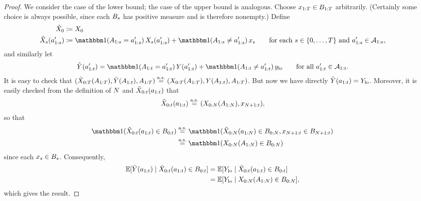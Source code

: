 \begin{proof}
    We consider the case of the lower bound; the case of the upper bound is analogous.
    Choose $x_{1:T} \in B_{1:T}$ arbitrarily.
    (Certainly some choice is always possible, since each $B_{s}$ has positive measure and is therefore nonempty.)
    Define
    \begin{align*}
        \tilde{\X}_0 &\coloneqq \X_0 \\
        \tilde{\X}_{\sx}(\ax_{1:\sx}') &\coloneqq \ind(\A_{1:\sx} = \ax_{1:\sx}') \, \X_{\sx}(\ax_{1:\sx}') + \ind(\A_{1:\sx} \neq \ax_{1:\sx}') \, \xx_{\sx} \qquad \text{for each $\sx \in \{0, \ldots, \T\}$ and $\ax_{1:\sx}' \in \Aspace_{1:\sx}$},
    \end{align*}
    and similarly let
    \[
        \tilde{\Y}(\ax_{1:\tx}') = \ind(\A_{1:\tx} = \ax_{1:\tx}') \, \Y(\ax_{1:\tx}') + \ind(\A_{1:\tx} \neq \ax_{1:\tx}')\, \ylo \qquad \text{for all $\ax_{1:\tx}' \in \Aspace_{1:\tx}$}.
    \]
    It is easy to check that $(\tilde{X}_{0:T}(A_{1:T}), \tilde{Y}(A_{1:t}), A_{1:T}) \overset{\mathrm{a.s.}}{=} (X_{0:T}(A_{1:T}), Y(A_{1:t}), A_{1:T})$.
    But now we have directly $\tilde{Y}(a_{1:t}) = Y_{\mathrm{lo}}$.
    Moreover, it is easily checked from the definition of $N$ and $\tilde{X}_{0:t}(a_{1:t})$ that
    \[
        \tilde{X}_{0:t}(a_{1:t}) \overset{\mathrm{a.s.}}{=} (X_{0:N}(A_{1:N}), x_{N+1:t}),
    \]
    so that
    \begin{align*}
        \ind(\tilde{\X}_{0:\tx}(\ax_{1:\tx}) \in \B_{0:\tx})
        &\eqas \ind(\tilde{\X}_{0:\N}(\ax_{1:\N}) \in \B_{0:\N}, \xx_{\N+1:\tx} \in \B_{\N+1:\tx}) \\
        &\eqas \ind(\X_{0:\N}(\A_{1:\N}) \in \B_{0:\N})
    \end{align*}
    since each $x_{s} \in B_s$.
    Consequently,
    \begin{align*}
        \mathbb{E}[\tilde{Y}(a_{1:t}) \mid \tilde{X}_{0:t}(a_{1:t}) \in B_{0:t}]
        &= \mathbb{E}[Y_{\mathrm{lo}} \mid \tilde{X}_{0:t}(a_{1:t}) \in B_{0:t}] \\
        &= \mathbb{E}[Y_{\mathrm{lo}} \mid X_{0:N}(A_{1:N}) \in B_{0:N}],
    \end{align*}
    which gives the result.
\end{proof}

